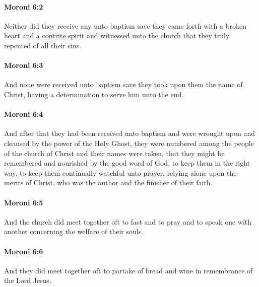 		\paragraph{Moroni 6:2} %
			\label{MORONI-6-2}

			Neither did they receive any unto baptism
			save they came forth with a broken heart and a \hyperref[CONTRITE]{contrite} spirit
			and witnessed unto the church
			that they truly repented of all their sins.

		\paragraph{Moroni 6:3} %
			\label{MORONI-6-3}

			And none were received unto baptism
			save they took upon them the name of Christ,
			having a determination to serve him unto the end.

		\paragraph{Moroni 6:4} %
			\label{MORONI-6-4}

			And after that they had been received unto baptism
			and were wrought upon and cleansed by the power of the Holy Ghost,
			they were numbered among the people of the church of Christ
			and their names were taken,
			that they might be remembered
			and nourished by the good word of God,
			to keep them in the right way,
			to keep them continually watchful unto prayer,
			relying alone upon the merits of Christ,
			who was the author and the finisher of their faith.

		\paragraph{Moroni 6:5} %
			\label{MORONI-6-5}

			And the church did meet together oft
			to fast and to pray and to speak one with another
			concerning the welfare of their souls.

		\paragraph{Moroni 6:6} %
			\label{MORONI-6-6}

			And they did meet together oft
			to partake of bread and wine in remembrance of the Lord Jesus.


